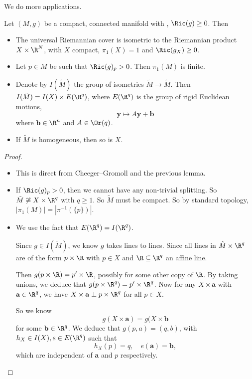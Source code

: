 \documentclass[a4paper]{article}
\begin{document}
We do more applications.

\begin{cor}
  Let $(M, g)$ be a compact, connected manifold with , $\Ric(g) \geq 0$. Then
  \begin{itemize}
    \item The universal Riemannian cover is isometric to the Riemannian product $X \times \R^N$, with $X$ compact, $\pi_1(X) = 1$ and $\Ric(g_X) \geq 0$.
    \item Let $p \in M$ be such that $\Ric(g)_p > 0$. Then $\pi_1(M)$ is finite.
    \item Denote by $I(\tilde{M})$ the group of isometries $\tilde{M} \to \tilde{M}$. Then $I (\tilde{M}) = I(X) \times E(\R^q)$, where $E(\R^q)$ is the group of rigid Euclidean motions,
      \[
        \mathbf{y} \mapsto A\mathbf{y} + \mathbf{b}
      \]
      where $\mathbf{b} \in \R^n$ and $A \in \Or(q)$.
    \item If $\tilde{M}$ is homogeneous, then so is $X$.
  \end{itemize}
\end{cor}

\begin{proof}\leavevmode
  \begin{itemize}
    \item This is direct from Cheeger--Gromoll and the previous lemma.
    \item If $\Ric(g)_p > 0$, then we cannot have any non-trivial splitting. So $\tilde{M} \not\cong X\times \R^q$ with $q \geq 1$. So $\tilde{M}$ must be compact. So by standard topology, $|\pi_1(M)| = |\pi^{-1}(\{p\})|$.
    \item We use the fact that $E(\R^q) = I(\R^q)$.

      Since $g \in I(\tilde{M})$, we know $g$ takes lines to lines. Since all lines in $\tilde{M} \times \R^q$ are of the form $p \times \R$ with $p \in X$ and $\R \subseteq \R^q$ an affine line.

      Then $g(p \times \R) = p' \times \R$, possibly for some other copy of $\R$. By taking unions, we deduce that $g(p \times \R^q) = p' \times \R^q$. Now for any $X \times \mathbf{a}$ with $\mathbf{a} \in \R^q$, we have $X \times \mathbf{a} \perp p \times \R^q$ for all $p \in X$.

      So we know
      \[
        g(X \times \mathbf{a}) = g(X \times \mathbf{b}
      \]
      for some $\mathbf{b} \in \R^q$. We deduce that $g(p, a) = (q, b)$, with $h_X \in I(X), e \in E(\R^q)$ such that
      \[
        h_X(p) = q,\quad e(\mathbf{a}) = \mathbf{b},
      \]
      which are independent of $\mathbf{a}$ and $p$ respectively.
  \end{itemize}
\end{proof}
\end{document}
